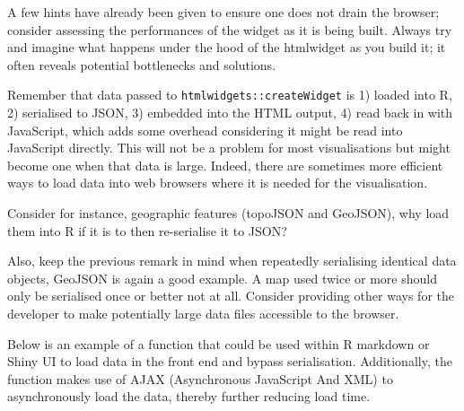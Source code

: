 \documentclass[10pt,]{krantz}
\makeatletter
\newenvironment{Shaded}{\begin{snugshade}}{\end{snugshade}}
\newcommand{\CommentTok}[1]{\textcolor[rgb]{0.37,0.37,0.37}{\textit{#1}}}
\newcommand{\ControlFlowTok}[1]{\textcolor[rgb]{0.27,0.27,0.27}{\textbf{#1}}}
\newcommand{\KeywordTok}[1]{\textcolor[rgb]{0.27,0.27,0.27}{\textbf{#1}}}
\newcommand{\NormalTok}[1]{#1}
\newcommand{\OperatorTok}[1]{\textcolor[rgb]{0.43,0.43,0.43}{\textbf{#1}}}
\newcommand{\StringTok}[1]{\textcolor[rgb]{0.5,0.5,0.5}{#1}}
\newenvironment{kframe}{%
\medskip{}
\setlength{\fboxsep}{.8em}
 \def\at@end@of@kframe{}%
 \ifinner\ifhmode%
  \def\at@end@of@kframe{\end{minipage}}%
  \begin{minipage}{\columnwidth}%
 \fi\fi%
 \def\FrameCommand##1{\hskip\@totalleftmargin \hskip-\fboxsep
 \colorbox{shadecolor}{##1}\hskip-\fboxsep
     \hskip-\linewidth \hskip-\@totalleftmargin \hskip\columnwidth}%
 \MakeFramed {\advance\hsize-\width
   \@totalleftmargin\z@ \linewidth\hsize
   \@setminipage}}%
 {\par\unskip\endMakeFramed%
 \at@end@of@kframe}
\renewenvironment{Shaded}{\begin{kframe}}{\end{kframe}}
\makeatother
\begin{document}
A few hints have already been given to ensure one does not drain the browser; consider assessing the performances of the widget as it is being built. Always try and imagine what happens under the hood of the htmlwidget as you build it; it often reveals potential bottlenecks and solutions.

Remember that data passed to \texttt{htmlwidgets::createWidget} is 1) loaded into R, 2) serialised to JSON, 3) embedded into the HTML output, 4) read back in with JavaScript, which adds some overhead considering it might be read into JavaScript directly. This will not be a problem for most visualisations but might become one when that data is large. Indeed, there are sometimes more efficient ways to load data into web browsers where it is needed for the visualisation.

Consider for instance, geographic features (topoJSON and GeoJSON), why load them into R if it is to then re-serialise it to JSON?

Also, keep the previous remark in mind when repeatedly serialising identical data objects, GeoJSON is again a good example. A map used twice or more should only be serialised once or better not at all. Consider providing other ways for the developer to make potentially large data files accessible to the browser.

Below is an example of a function that could be used within R markdown or Shiny UI to load data in the front end and bypass serialisation. Additionally, the function makes use of AJAX (Asynchronous JavaScript And XML) to asynchronously load the data, thereby further reducing load time.

\begin{Shaded}
\end{Shaded}
\end{document}
